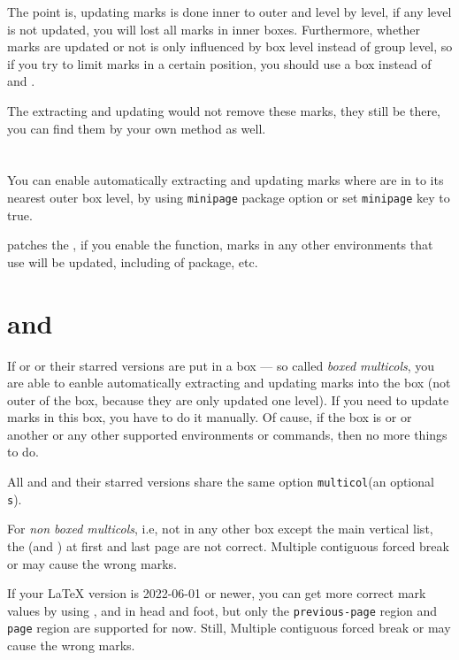 \documentclass{l3doc}
\begin{document}
The point is, updating marks is done inner to outer and level by level, 
if any level is not updated, you will lost all marks in inner boxes.
Furthermore, whether marks are updated or not is only influenced by box level
instead of group level, so if you try to limit marks in a certain position, you should
use a box instead of  and .

The extracting and updating would not remove these marks, they still be there, you 
can find them by your own method as well.


\section{}

You can enable automatically extracting and updating marks where are in 
to its nearest outer box level,
by using \texttt{minipage} package option or set \texttt{minipage} key to true.

 patches the , if you enable the function,
marks in any other environments that use  will be updated, 
including  of  package, etc.


\section{ and }

If  or  or their starred versions are put in a box
--- so called \emph{boxed multicols}, you are able to eanble automatically extracting 
and updating marks into the box (not outer of the box, because they are only updated
one level).
If you need to update marks in this box, you have to do it manually.
Of cause, if the box is  or  or another 
or any other supported environments or commands, then no more things to do.

All  and  and their starred versions share the 
same option \texttt{multicol}(an optional \texttt s).

For \emph{non boxed multicols}, i.e, not in any other box except 
the main vertical list, the  (and ) at first and last page 
are not correct. Multiple contiguous forced break or  may cause the 
wrong marks.

If your {\LaTeX} version is 2022-06-01 or newer,
you can get more correct mark values by using ,  
and  in head and foot, but only the 
\texttt{previous-page} region and \texttt{page} region are supported for now.
Still, Multiple contiguous forced break or  may cause the wrong marks.
\end{document}
